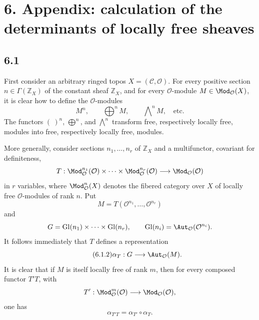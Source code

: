 \documentclass[11pt]{article}
\providecommand{\Gl}{\operatorname{Gl}}
\begin{document}
\section*{6. Appendix: calculation of the determinants of locally free sheaves}

\subsection*{6.1}
First consider an arbitrary ringed topos \(X=(\mathcal C,\mathcal O)\). For every positive section \(n\in\Gamma(\mathbb Z_X)\) of the constant sheaf \(\mathbb Z_X\), and for every \(\mathcal O\)-module \(M\in\Mod_{\mathcal O}(X)\), it is clear how to define the \(\mathcal O\)-modules
\begin{equation}\tag{6.1.1}
 M^n,\qquad \bigoplus\nolimits^n M,\qquad \bigwedge\nolimits^n M,\quad\text{etc.}
\end{equation}
The functors \((\ )^n\), \(\bigoplus^n\), and \(\bigwedge^n\) transform free, respectively locally free, modules into free, respectively locally free, modules.

More generally, consider sections \(n_1,\ldots,n_r\) of \(\mathbb Z_X\) and a multifunctor, covariant for definiteness,
\[
 T:\Mod^{n_1}_{\mathcal O}(\mathcal O)\times\cdots\times
 \Mod^{n_r}_{\mathcal O}(\mathcal O)\longrightarrow\Mod_{\mathcal O}(\mathcal O)
\]
in \(r\) variables, where \(\Mod^{n}_{\mathcal O}(X)\) denotes the fibered category over \(X\) of locally free \(\mathcal O\)-modules of rank \(n\). Put
\[
 M=T(\mathcal O^{n_1},\ldots,\mathcal O^{n_r})
\]
and
\[
 G=\Gl(n_1)\times\cdots\times\Gl(n_r),\qquad
 \Gl(n_i)=\Aut_{\mathcal O}(\mathcal O^{n_i}).
\]
It follows immediately that \(T\) defines a representation
\begin{equation}\tag{6.1.2}
 \alpha_T:G\longrightarrow\Aut_{\mathcal O}(M).
\end{equation}
It is clear that if \(M\) is itself locally free of rank \(m\), then for every composed functor \(T'T\), with
\[
 T':\Mod_{\mathcal O}^m(\mathcal O)\longrightarrow\Mod_{\mathcal O}(\mathcal O),
\]
one has
\begin{equation}\tag{6.1.3}
 \alpha_{T'T}=\alpha_{T'}\circ\alpha_T.
\end{equation}
\end{document}
